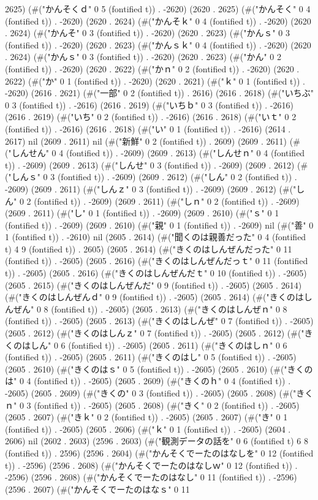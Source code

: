 2625) (#("かんそくｄ" 0 5 (fontified t)) . -2620) (2620 . 2625) (#("かんそく" 0 4 (fontified t)) . -2620) (2620 . 2624) (#("かんそｋ" 0 4 (fontified t)) . -2620) (2620 . 2624) (#("かんそ" 0 3 (fontified t)) . -2620) (2620 . 2623) (#("かんｓ" 0 3 (fontified t)) . -2620) (2620 . 2623) (#("かんｓｋ" 0 4 (fontified t)) . -2620) (2620 . 2624) (#("かんｓ" 0 3 (fontified t)) . -2620) (2620 . 2623) (#("かん" 0 2 (fontified t)) . -2620) (2620 . 2622) (#("かｎ" 0 2 (fontified t)) . -2620) (2620 . 2622) (#("か" 0 1 (fontified t)) . -2620) (2620 . 2621) (#("ｋ" 0 1 (fontified t)) . -2620) (2616 . 2621) (#("一部" 0 2 (fontified t)) . 2616) (2616 . 2618) (#("いちぶ" 0 3 (fontified t)) . -2616) (2616 . 2619) (#("いちｂ" 0 3 (fontified t)) . -2616) (2616 . 2619) (#("いち" 0 2 (fontified t)) . -2616) (2616 . 2618) (#("いｔ" 0 2 (fontified t)) . -2616) (2616 . 2618) (#("い" 0 1 (fontified t)) . -2616) (2614 . 2617) nil (2609 . 2611) nil (#("新鮮" 0 2 (fontified t)) . 2609) (2609 . 2611) (#("しんせん" 0 4 (fontified t)) . -2609) (2609 . 2613) (#("しんせｎ" 0 4 (fontified t)) . -2609) (2609 . 2613) (#("しんせ" 0 3 (fontified t)) . -2609) (2609 . 2612) (#("しんｓ" 0 3 (fontified t)) . -2609) (2609 . 2612) (#("しん" 0 2 (fontified t)) . -2609) (2609 . 2611) (#("しんｚ" 0 3 (fontified t)) . -2609) (2609 . 2612) (#("しん" 0 2 (fontified t)) . -2609) (2609 . 2611) (#("しｎ" 0 2 (fontified t)) . -2609) (2609 . 2611) (#("し" 0 1 (fontified t)) . -2609) (2609 . 2610) (#("ｓ" 0 1 (fontified t)) . -2609) (2609 . 2610) (#("親" 0 1 (fontified t)) . -2609) nil (#("善" 0 1 (fontified t)) . -2610) nil (2605 . 2614) (#("聞くのは親善だった" 0 4 (fontified t) 4 9 (fontified t)) . 2605) (2605 . 2614) (#("きくのはしんぜんだった" 0 11 (fontified t)) . -2605) (2605 . 2616) (#("きくのはしんぜんだっｔ" 0 11 (fontified t)) . -2605) (2605 . 2616) (#("きくのはしんぜんだｔ" 0 10 (fontified t)) . -2605) (2605 . 2615) (#("きくのはしんぜんだ" 0 9 (fontified t)) . -2605) (2605 . 2614) (#("きくのはしんぜんｄ" 0 9 (fontified t)) . -2605) (2605 . 2614) (#("きくのはしんぜん" 0 8 (fontified t)) . -2605) (2605 . 2613) (#("きくのはしんぜｎ" 0 8 (fontified t)) . -2605) (2605 . 2613) (#("きくのはしんぜ" 0 7 (fontified t)) . -2605) (2605 . 2612) (#("きくのはしんｚ" 0 7 (fontified t)) . -2605) (2605 . 2612) (#("きくのはしん" 0 6 (fontified t)) . -2605) (2605 . 2611) (#("きくのはしｎ" 0 6 (fontified t)) . -2605) (2605 . 2611) (#("きくのはし" 0 5 (fontified t)) . -2605) (2605 . 2610) (#("きくのはｓ" 0 5 (fontified t)) . -2605) (2605 . 2610) (#("きくのは" 0 4 (fontified t)) . -2605) (2605 . 2609) (#("きくのｈ" 0 4 (fontified t)) . -2605) (2605 . 2609) (#("きくの" 0 3 (fontified t)) . -2605) (2605 . 2608) (#("きくｎ" 0 3 (fontified t)) . -2605) (2605 . 2608) (#("きく" 0 2 (fontified t)) . -2605) (2605 . 2607) (#("きｋ" 0 2 (fontified t)) . -2605) (2605 . 2607) (#("き" 0 1 (fontified t)) . -2605) (2605 . 2606) (#("ｋ" 0 1 (fontified t)) . -2605) (2604 . 2606) nil (2602 . 2603) (2596 . 2603) (#("観測データの話を" 0 6 (fontified t) 6 8 (fontified t)) . 2596) (2596 . 2604) (#("かんそくでーたのはなしを" 0 12 (fontified t)) . -2596) (2596 . 2608) (#("かんそくでーたのはなしｗ" 0 12 (fontified t)) . -2596) (2596 . 2608) (#("かんそくでーたのはなし" 0 11 (fontified t)) . -2596) (2596 . 2607) (#("かんそくでーたのはなｓ" 0 11 